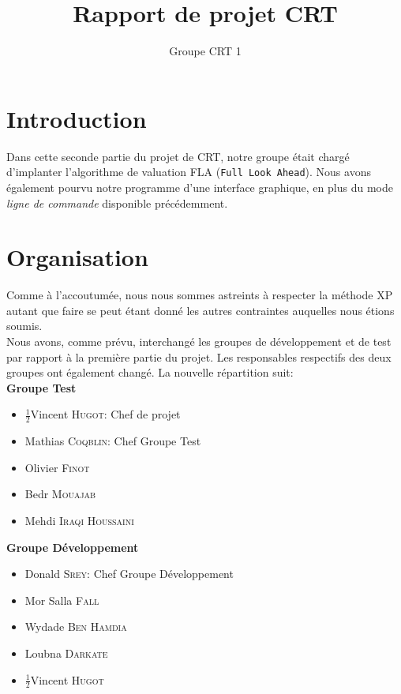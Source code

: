 \documentclass[a4paper,12pt]{article}
\author{Groupe CRT 1}
\title{Rapport de projet CRT}
\def\familyname{\textsc}
\def\firstname#1{#1}
\def\groupmember#1#2{\firstname{#1} \familyname{#2}}
\def\mwyd{\groupmember{Wydade}{Ben Hamdia}}
\def\mmat{\groupmember{Mathias}{Coqblin}}
\def\mlou{\groupmember{Loubna}{Darkate}}
\def\mmor{\groupmember{Mor Salla}{Fall}}
\def\moli{\groupmember{Olivier}{Finot}}
\def\mvin{\groupmember{Vincent}{Hugot}}
\def\mmed{\groupmember{Mehdi}{Iraqi Houssaini}}
\def\mbed{\groupmember{Bedr}{Mouajab}}
\def\mdon{\groupmember{Donald}{Srey}}
\def\grpd{Groupe Développement}
\def\grpt{Groupe Test}
\begin{document}
 
\maketitle

\tableofcontents



\section{Introduction}

Dans cette seconde partie du projet de CRT, notre groupe était
chargé d'implanter l'algorithme de valuation FLA (\texttt{Full Look Ahead}).
Nous avons également pourvu notre programme d'une interface graphique,
en plus du mode \emph{ligne de commande} disponible précédemment.

\section{Organisation}

Comme à l'accoutumée, nous nous sommes astreints à respecter la
méthode XP autant que faire se peut étant donné les autres contraintes
auquelles nous étions soumis.\mk\\
%
Nous avons, comme prévu, interchangé les groupes de développement et 
de test par rapport à la première partie du projet. 
Les responsables respectifs des deux groupes ont également changé.
La nouvelle répartition suit:\mk\\
%
\textbf{\grpt}
\begin{itemize}
\item $\frac12$\mvin : Chef de projet
\item \mmat : Chef \grpt
\item \moli
\item \mbed
\item \mmed \mk\\
\end{itemize}

\textbf{\grpd}
\begin{itemize}
\item \mdon : Chef \grpd
\item \mmor
\item \mwyd 
\item \mlou
\item $\frac12$\mvin 
\end{itemize}
\end{document}
